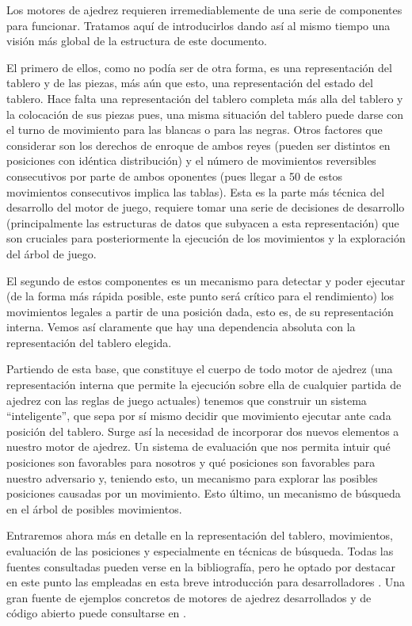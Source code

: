 \documentclass[letterpaper,12pt]{article}
\begin{document}
Los motores de ajedrez requieren irremediablemente de una serie de componentes para
funcionar. Tratamos aquí de introducirlos dando así al mismo tiempo una visión más 
global de la estructura de este documento.

El primero de ellos, como no podía ser de otra forma, es una representación
del tablero y de las piezas, más aún que esto, una representación del estado del 
tablero. Hace falta una representación del tablero completa más alla del tablero y la
colocación de sus piezas pues, una misma situación del tablero puede darse con el turno
de movimiento para las blancas o para las negras. Otros factores que considerar son los
derechos de enroque de ambos reyes (pueden ser distintos en posiciones con idéntica
distribución) y el número de movimientos reversibles consecutivos por parte de ambos 
oponentes (pues llegar a 50 de estos movimientos consecutivos implica las tablas). Esta
es la parte más técnica del desarrollo del motor de juego, requiere tomar una serie de
decisiones de desarrollo (principalmente las estructuras de datos que subyacen a esta
representación) que son cruciales para posteriormente la ejecución de los movimientos y
la exploración del árbol de juego.

El segundo de estos componentes es un mecanismo para detectar y poder ejecutar (de la 
forma más rápida posible, este punto será crítico para el rendimiento) los movimientos
legales a partir de una posición dada, esto es, de su representación interna. Vemos así
claramente que hay una dependencia absoluta con la representación del tablero elegida.

Partiendo de esta base, que constituye el cuerpo de todo motor de ajedrez (una
representación interna que permite la ejecución sobre ella de cualquier partida de ajedrez
con las reglas de juego actuales) tenemos que construir un sistema ``inteligente'', que
sepa por sí mismo decidir que movimiento ejecutar ante cada posición del tablero. Surge 
así la necesidad de incorporar dos nuevos elementos a nuestro motor de ajedrez. Un sistema
de evaluación que nos permita intuir qué posiciones son favorables para nosotros y qué 
posiciones son favorables para nuestro adversario y, teniendo esto, un mecanismo para 
explorar las posibles posiciones causadas por un movimiento. Esto último, un mecanismo de 
búsqueda en el árbol de posibles movimientos.

Entraremos ahora más en detalle en la representación del tablero, movimientos, evaluación
de las posiciones y especialmente en técnicas de búsqueda. Todas las fuentes consultadas
pueden verse en la bibliografía, pero he optado por destacar en este punto las empleadas en
esta breve introducción para desarrolladores \cite{Fundamentos2, Fundamentos1}. Una gran 
fuente de ejemplos concretos de motores de ajedrez desarrollados y de código abierto puede
consultarse en \cite{Open Source Chess Engines}.
\end{document}
